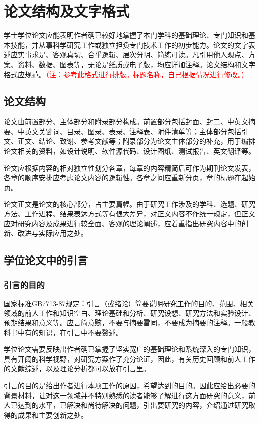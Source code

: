 \chapter{论文结构及文字格式}
学士学位论文应能表明作者确已较好地掌握了本门学科的基础理论、专门知识和基本技能，并从事科学研究工作或独立担负专门技术工作的初步能力。论文的文字表述应实事求是、客观真切、合乎逻辑、层次分明、简练可读。凡引用他人观点、方案、资料、数据、图表等，无论是纸质或电子版，均应详加注释。论文结构和文字格式应规范。\textcolor{red}{（注：参考此格式进行排版。标题名称，自己根据情况进行修改。）}
\section{论文结构}
论文由前置部分、主体部分和附录部分构成。前置部分包括封面、封二、中英文摘要、中英文关键词、目录、图录、表录、注释表、附件清单等；主体部分包括引文、正文、结论、致谢、参考文献等；附录部分为论文主体部分的补充，用于编排论文相关的资料，如设计说明、软件源代码、设计图纸、测试报告、英文翻译等。

论文应根据内容的相对独立性划分各章，每章的内容精简后可作为期刊论文发表，各章的顺序安排应考虑论文内容的逻辑性。各章之间应重新分页，章的标题在起始页。

论文正文是论文的核心部分，占主要篇幅。由于研究工作涉及的学科、选题、研究方法、工作进程、结果表达方式等有很大差异，对正文内容不作统一规定，但正文应对研究内容及成果进行较全面、客观的理论阐述，应着重指出研究内容中的创新、改进与实际应用之处。


\section{学位论文中的引言}
\subsection{引言的目的}
国家标准GB7713-87规定：引言（或绪论）简要说明研究工作的目的、范围、相关领域的前人工作和知识空白、理论基础和分析、研究设想、研究方法和实验设计、预期结果和意义等。应言简意赅，不要与摘要雷同，不要成为摘要的注释。一般教科书中有的知识，在引言中不要赘述。

学位论文需要反映出作者确已掌握了坚实宽广的基础理论和系统深入的专门知识，具有开阔的科学视野，对研究方案作了充分论证，因此，有关历史回顾和前人工作的文献综述，以及理论分析都可以放在引言里。

引言的目的是给出作者进行本项工作的原因，希望达到的目的。因此应给出必要的背景材料，让对这一领域并不特别熟悉的读者能够了解进行这方面研究的意义，前人已达到的水平，已解决和尚待解决的问题，引出要研究的内容，介绍通过研究取得的成果和主要创新之处。



